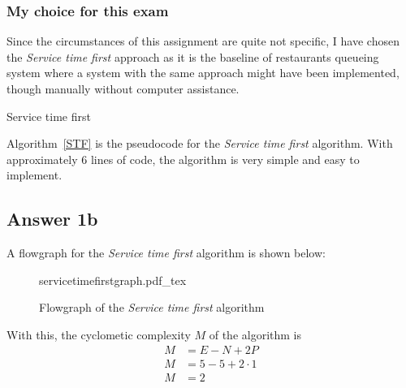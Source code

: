 \documentclass[
  11pt, %
]{assignment}
\begin{document}
\subsubsection*{My choice for this exam}

Since the circumstances of this assignment are quite not specific, I have chosen the \textit{Service time first} approach as it is the baseline of restaurants queueing system where a system with the same approach might have been implemented, though manually without computer assistance.

\medskip

\begin{algorithm}[H]
  \LinesNumbered{}
  \SetAlgoVlined{}


  \caption{Service time first\label{STF}}
\end{algorithm}

\medskip

Algorithm~\ref{STF} is the pseudocode for the \textit{Service time first} algorithm. With approximately 6 lines of code, the algorithm is very simple and easy to implement.

\subsection*{Answer 1b}

A flowgraph for the \textit{Service time first} algorithm is shown below:

\begin{figure}[ht]
  \centering
  {servicetimefirstgraph.pdf_tex}
  \caption{Flowgraph of the \textit{Service time first} algorithm}
  \label{fig:stf_graph}
\end{figure}


With this, the cyclometic complexity \(M\) of the algorithm is
\[
  \begin{aligned}
    M & = E - N + 2P        \\
    M & = 5 - 5 + 2 \cdot 1 \\
    M & = 2                 \\
  \end{aligned}
\]
\end{document}
